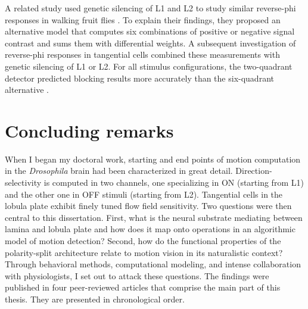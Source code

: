 A related study used genetic silencing of L1 and L2 to study similar reverse-phi responses in walking fruit flies \citep{Clark:2011gw}. To explain their findings, they proposed an alternative model that computes six combinations of positive or negative signal contrast and sums them with differential weights. A subsequent investigation of reverse-phi responses in tangential cells combined these measurements with genetic silencing of L1 or L2. For all stimulus configurations, the two-quadrant detector predicted blocking results more accurately than the six-quadrant alternative \citep{Joesch:2013ew}.

\section{Concluding remarks}
When I began my doctoral work, starting and end points of motion computation in the \textit{Drosophila} brain had been characterized in great detail. Direction-selectivity is computed in two channels, one specializing in ON (starting from L1) and the other one in OFF stimuli (starting from L2). Tangential cells in the lobula plate exhibit finely tuned flow field sensitivity. Two questions were then central to this dissertation. First, what is the neural substrate mediating between lamina and lobula plate and how does it map onto operations in an algorithmic model of motion detection? Second, how do the functional properties of the polarity-split architecture relate to motion vision in its naturalistic context? Through behavioral methods, computational modeling, and intense collaboration with physiologists, I set out to attack these questions. The findings were published in four peer-reviewed articles that comprise the main part of this thesis. They are presented in chronological order.